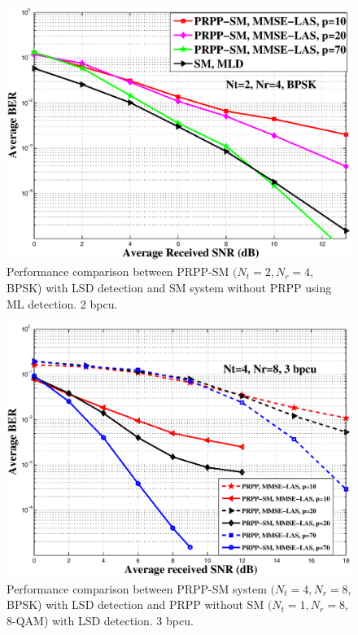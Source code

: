 \documentclass[11pt, onecolumn]{report}
\begin{document}
\begin{figure}[htb]
\centering

\includegraphics[totalheight=9cm,width=12cm]{prpp_sm_vs_withoutsm_mmse_las.eps}
\caption{Performance comparison between PRPP-SM $(N_t=2, N_r=4,$ BPSK) with LSD detection  and SM system without PRPP using ML detection. 2 bpcu.}
\label{smmmselas}
\end{figure}
\begin{figure}[htb]
\centering

\includegraphics[totalheight=9cm,width=12cm]{prpp_sm_las.eps}
\caption{Performance comparison between PRPP-SM system $(N_t=4, N_r=8$, BPSK) with LSD detection  and PRPP without SM $(N_t=1,N_r=8$, 8-QAM) with LSD detection. 3 bpcu.}
\label{sisolas}
\end{figure}
\end{document}
